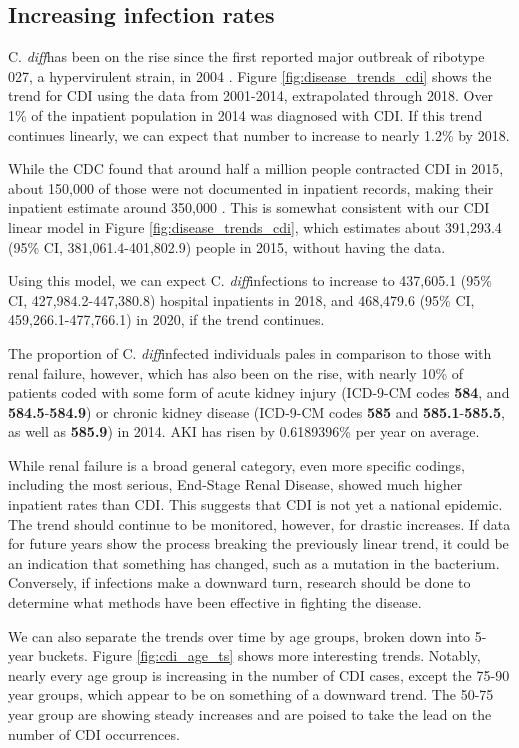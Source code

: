 \documentclass[12pt]{ociamthesis}\usepackage[]{graphicx}\usepackage[]{color}
\newcommand{\cdiff}{C. \textit{diff}}
\newcommand{\ci}[3]{#1 (95\% CI, #2-#3)}
\begin{document}
\subsection{Increasing infection rates}

\cdiff has been on the rise since the first reported major outbreak of ribotype 027, a hypervirulent strain, in 2004 \cite{Pepin2004}. 
Figure \ref{fig:disease_trends_cdi} shows the trend for CDI using the data from 2001-2014, extrapolated through 2018. 
Over 1\% of the inpatient population in 2014 was diagnosed with CDI. If this trend continues linearly, we can expect that number
to increase to nearly 1.2\% by 2018. 

While the CDC found that around half a million people contracted CDI in 2015, about 150,000 of those were not documented in 
inpatient records, making their inpatient estimate around 350,000 \cite{CDC2018}. This is somewhat consistent with our CDI linear model in 
Figure \ref{fig:disease_trends_cdi}, which estimates about \ci{391,293.4}{381,061.4}{401,802.9} people in 2015,
without having the data.

Using this model, we can expect \cdiff infections to increase to \ci{437,605.1}{427,984.2}{447,380.8} hospital inpatients in 2018, and
\ci{468,479.6}{459,266.1}{477,766.1} in 2020, if the trend continues.




The proportion of \cdiff infected individuals pales in comparison to those with renal failure, however, 
which has also been on the rise, with nearly 10\% of patients coded with
some form of acute kidney injury (ICD-9-CM codes \textbf{584}, and \textbf{584.5}-\textbf{584.9}) or chronic kidney disease 
(ICD-9-CM codes \textbf{585} and \textbf{585.1}-\textbf{585.5}, as well as \textbf{585.9}) in 2014. AKI has risen 
by 0.6189396\% per year on average.

While renal failure is a broad general category, even more specific codings, including the most serious, 
End-Stage Renal Disease, showed much higher inpatient rates than CDI. 
This suggests that CDI is not yet a national epidemic. The trend should continue to be
monitored, however, for drastic increases. If data for future years show the process breaking the previously linear trend, it could be an indication
that something has changed, such as a mutation in the bacterium. Conversely, if infections make a downward turn, research should be done
to determine what methods have been effective in fighting the disease.


We can also separate the trends over time by age groups, broken down into 5-year buckets. Figure \ref{fig:cdi_age_ts} shows more interesting trends.
Notably, nearly every age group is increasing in the number of CDI cases, except the 75-90 year groups, which appear to be on something of a downward trend.
The 50-75 year group are showing steady increases and are poised to take the lead on the number of CDI occurrences. 
\end{document}
